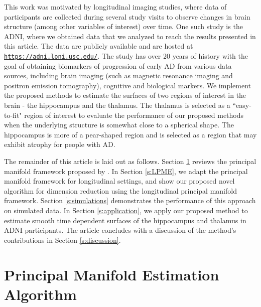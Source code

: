 \documentclass[12pt]{article}
\theoremstyle{definition}
\begin{document}
This work was motivated by longitudinal imaging studies, where data of participants are collected during several study visits to observe changes in brain structure (among other variables of interest) over time. One such study is the ADNI, where we obtained data that we analyzed to reach the results presented in this article. The data are publicly available and are hosted at \href{https://adni.loni.usc.edu/}{\texttt{https://adni.loni.usc.edu/}}. The study has over 20 years of history with the goal of obtaining biomarkers of progression of early AD from various data sources, including brain imaging (such as magnetic resonance imaging and positron emission tomography), cognitive and biological markers. We implement the proposed methods to estimate the surfaces of two regions of interest in the brain - the hippocampus and the thalamus. The thalamus is selected as a ``easy-to-fit" region of interest to evaluate the performance of our proposed methods when the underlying structure is somewhat close to a spherical shape. The hippocampus is more of a pear-shaped region and is selected as a region that may exhibit atrophy for people with AD. 

The remainder of this article is laid out as follows. Section \ref{s:PME} reviews the principal manifold framework proposed by \cite{mengPrincipalManifoldEstimation2021}. In Section \ref{s:LPME}, we adapt the principal manifold framework for longitudinal settings, and show our proposed novel algorithm for dimension reduction using the longitudinal principal manifold framework. Section \ref{s:simulations} demonstrates the performance of this approach on simulated data. In Section \ref{s:application}, we apply our proposed method to estimate smooth time dependent surfaces of the hippocampus and thalamus in ADNI participants. The article concludes with a discussion of the method's contributions in Section \ref{s:discussion}.








\section{Principal Manifold Estimation Algorithm}\label{s:PME}
\end{document}
